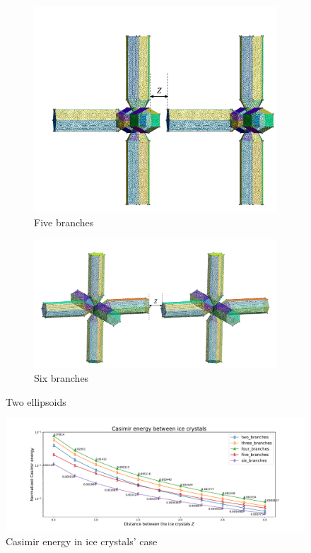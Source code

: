 \begin{figure}[H]
\begin{subfigure}{.5\linewidth}
    \includegraphics[scale = 0.4]{figures/5branches}
    \caption{Five branches}
    \end{subfigure}%
    \begin{subfigure}{.5\linewidth}
    \centering
    \includegraphics[scale = 0.4]{figures/6branches}
    \caption{Six branches}
    \end{subfigure}
    \caption{Two ellipsoids}
    \end{figure}

    \begin{figure}[H]
        \centering
        \hspace*{-1cm}\includegraphics[scale = 0.5]{figures/CasE_ice_crystals.pdf}
        \caption{Casimir energy in ice crystals' case}
    \end{figure}
    

